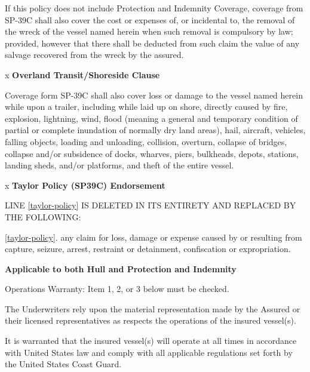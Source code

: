 \documentclass[10pt]{article}
\begin{document}
If this policy does not include Protection and Indemnity Coverage, coverage from SP-39C shall also cover the cost or expenses of, or incidental to, the removal of the wreck of the vessel named herein when such removal is compulsory by law; provided, however that there shall be deducted from such claim the value of any salvage recovered from the wreck by the assured.

\vspace{\baselineskip}
x \hspace{0.25in} \textbf{Overland Transit/Shoreside Clause}

Coverage form SP-39C shall also cover loss or damage to the vessel named herein while upon a trailer, including while laid up on shore, directly caused by fire, explosion, lightning, wind, flood (meaning a general and temporary condition of partial or complete inundation of normally dry land areas), hail, aircraft, vehicles, falling objects, loading and unloading, collision, overturn, collapse of bridges, collapse and/or subsidence of docks, wharves, piers, bulkheads, depots, stations, landing sheds, and/or platforms, and theft of the entire vessel.

\vspace{\baselineskip}
x \hspace{0.25in} \textbf{Taylor Policy (SP39C) Endorsement}

LINE \ref{taylor-policy} IS DELETED IN ITS ENTIRETY AND REPLACED BY THE FOLLOWING:

\ref{taylor-policy}.  any claim for loss, damage or expense caused by or resulting from capture, seizure, arrest, restraint or detainment, confiscation or expropriation.

\vspace{\baselineskip}
\textbf{Applicable to both Hull and Protection and Indemnity}

Operations Warranty: Item 1, 2, or 3 below must be checked.

The Underwriters rely upon the material representation made by the Assured or their licensed representatives as respects the operations of the insured vessel(s).

It is warranted that the insured vessel(s) will operate at all times in accordance with United States law and comply with all applicable regulations set forth by the United States Coast Guard.
\end{document}
